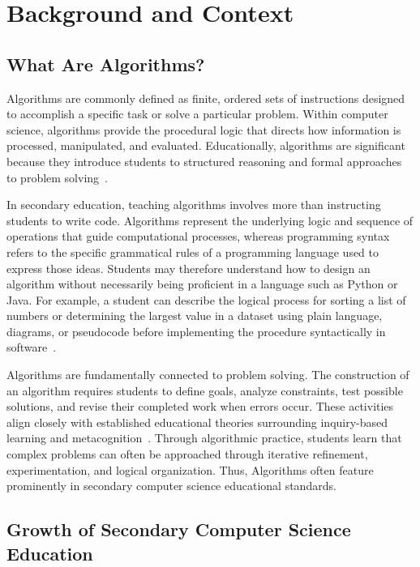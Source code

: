 \documentclass[../main.tex]{subfiles}
\begin{document}
\section{Background and Context}
\subsection{What Are Algorithms?}
Algorithms are commonly defined as finite, ordered sets of instructions designed to accomplish a specific task or solve a particular problem.
Within computer science, algorithms provide the procedural logic that directs how information is processed, manipulated, and evaluated.
Educationally, algorithms are significant because they introduce students to structured reasoning and formal approaches to problem
  solving~\cite{grover2017assessing}\cite{nijenhuis2023teaching}.

In secondary education, teaching algorithms involves more than instructing students to write code.
Algorithms represent the underlying logic and sequence of operations that guide computational processes, whereas programming syntax refers to the
  specific grammatical rules of a programming language used to express those ideas.
Students may therefore understand how to design an algorithm without necessarily being proficient in a language such as Python or Java.
For example, a student can describe the logical process for sorting a list of numbers or determining the largest value in a dataset using plain
  language, diagrams, or pseudocode before implementing the procedure syntactically in
  software~\cite{nijenhuis2023teaching}\cite{futschek2006algorithmic}.

Algorithms are fundamentally connected to problem solving.
The construction of an algorithm requires students to define goals, analyze constraints, test possible solutions, and revise their completed work
  when errors occur.
These activities align closely with established educational theories surrounding inquiry-based learning and metacognition~\cite{grover2017assessing}.
Through algorithmic practice, students learn that complex problems can often be approached through iterative refinement, experimentation, and logical
  organization.
Thus, Algorithms often feature prominently in secondary computer science educational standards.

\subsection{Growth of Secondary Computer Science Education}
\end{document}
